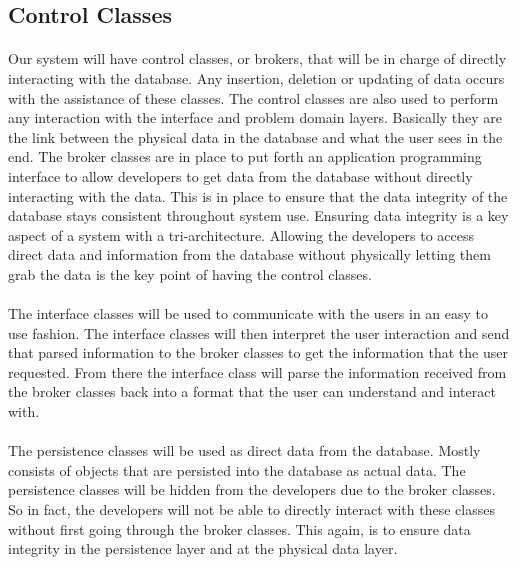 \documentclass[letterpaper,12pt]{report}
\begin{document}
\subsection*{Control Classes}
\paragraph*{}\hspace{0.6cm}Our system will have control classes, or brokers, that will be in charge of directly interacting with the database. Any insertion, deletion or updating of data occurs with the assistance of these classes. The control classes are also used to perform any interaction with the interface and problem domain layers. Basically they are the link between the physical data in the database and what the user sees in the end. The broker classes are in place to put forth an application programming interface to allow developers to get data from the database without directly interacting with the data. This is in place to ensure that the data integrity of the database stays consistent throughout system use. Ensuring data integrity is a key aspect of a system with a tri-architecture. Allowing the developers to access direct data and information from the database without physically letting them grab the data is the key point of having the control classes.\newline
\paragraph*{}\hspace{0.6cm}The interface classes will be used to communicate with the users in an easy to use fashion. The interface classes will then interpret the user interaction and send that parsed information to the broker classes to get the information that the user requested. From there the interface class will parse the information received from the broker classes back into a format that the user can understand and interact with.\newline
\paragraph*{}\hspace{0.6cm}The persistence classes will be used as direct data from the database. Mostly consists of objects that are persisted into the database as actual data. The persistence classes will be hidden from the developers due to the broker classes. So in fact, the developers will not be able to directly interact with these classes without first going through the broker classes. This again, is to ensure data integrity in the persistence layer and at the physical data layer.
\pagebreak
\end{document}
